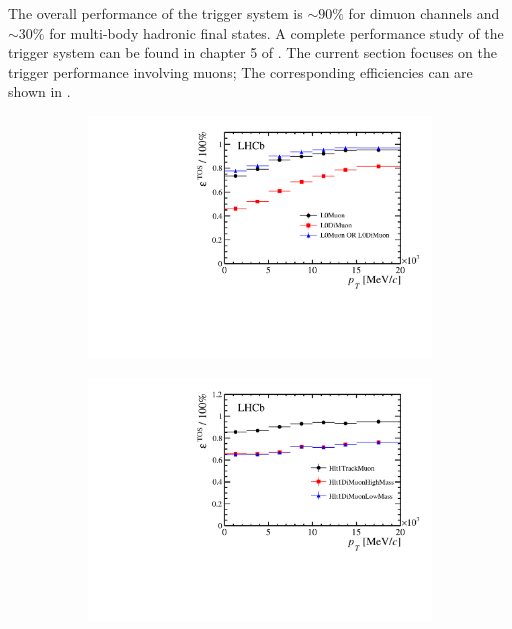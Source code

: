 The overall performance of the \lhcb trigger system is $\sim 90\%$ for dimuon channels and $\sim 30\%$ for
multi-body hadronic final states. A complete performance study of the trigger system can be found in chapter
5 of \cite{Aaij:2014jba}. The current section focuses on the trigger performance involving muons; The corresponding
efficiencies can are shown in .


\begin{figure}[t]
  \centering
  \begin{subfigure}{0.5\textwidth}
    \raggedright
    \includegraphics[width=\textwidth,trim=0.45cm 0cm 0.4cm 0cm, clip=true]{Figures/Chapter2/l0_muon_eff}
    \caption{}
    \label{det_run_one_l0_muon_line_eff}
  \end{subfigure}%
  \begin{subfigure}{0.5\textwidth}
    \raggedleft
    \includegraphics[width=\textwidth,trim=0.45cm 0cm 0.4cm 0cm, clip=true]{Figures/Chapter2/hlt1_muon_eff}

\end{subfigure}
\end{figure}
